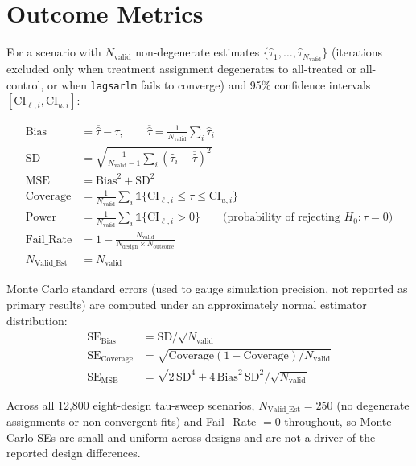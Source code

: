 \documentclass[11pt]{article}
\begin{document}
\section{Outcome Metrics}
\label{sec:s3}

For a scenario with $N_{\text{valid}}$ non-degenerate estimates
$\{\hat\tau_1,\dots,\hat\tau_{N_{\text{valid}}}\}$ (iterations excluded only when
treatment assignment degenerates to all-treated or all-control, or when
\texttt{lagsarlm} fails to converge) and 95\% confidence intervals
$[\text{CI}_{\ell,i}, \text{CI}_{u,i}]$:

\begin{align*}
\text{Bias} &= \overline{\hat\tau} - \tau, \qquad \overline{\hat\tau} = \frac{1}{N_{\text{valid}}}\sum_i \hat\tau_i \\
\text{SD} &= \sqrt{\frac{1}{N_{\text{valid}}-1}\sum_i (\hat\tau_i - \overline{\hat\tau})^2} \\
\text{MSE} &= \text{Bias}^2 + \text{SD}^2 \\
\text{Coverage} &= \frac{1}{N_{\text{valid}}}\sum_i \mathbb{1}\{\text{CI}_{\ell,i} \le \tau \le \text{CI}_{u,i}\} \\
\text{Power} &= \frac{1}{N_{\text{valid}}}\sum_i \mathbb{1}\{\text{CI}_{\ell,i} > 0\} \qquad \text{(probability of rejecting } H_0: \tau=0\text{)} \\
\text{Fail\_Rate} &= 1 - \frac{N_{\text{valid}}}{N_{\text{design}} \times N_{\text{outcome}}} \\
N_{\text{Valid\_Est}} &= N_{\text{valid}}
\end{align*}

Monte Carlo standard errors (used to gauge simulation precision, not reported as
primary results) are computed under an approximately normal estimator
distribution:
\begin{align*}
\text{SE}_{\text{Bias}} &= \text{SD} / \sqrt{N_{\text{valid}}} \\
\text{SE}_{\text{Coverage}} &= \sqrt{\text{Coverage}(1-\text{Coverage}) / N_{\text{valid}}} \\
\text{SE}_{\text{MSE}} &= \sqrt{2\,\text{SD}^4 + 4\,\text{Bias}^2\,\text{SD}^2} / \sqrt{N_{\text{valid}}}
\end{align*}

Across all 12{,}800 eight-design tau-sweep scenarios, $N_{\text{Valid\_Est}}=250$
(no degenerate assignments or non-convergent fits) and Fail\_Rate $=0$ throughout,
so Monte Carlo SEs are small and uniform across designs and are not a driver of
the reported design differences.
\end{document}
